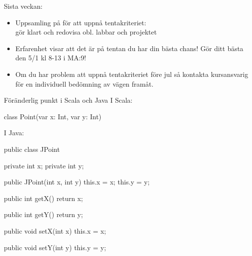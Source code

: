 \newcommand{\legend}[2][]{
    \begin{scope}[#1]
    \path
        \foreach \n/\s in {#2}
            {
                  ++(0,-10pt) node[\s,legend box] {} +(5pt,0) node[legend label] {\n}
            }
    ;
    \end{scope}
}


\ifkompendium\else

\begin{Slide}{Sista veckan:}

  \begin{itemize}
    \item Uppsamling på  för att uppnå tentakriteriet: \\ gör klart och redovisa  obl. labbar och projektet

    \item Erfarenhet visar att det är på   tentan du har din bästa chans! Gör ditt bästa den 5/1 kl 8-13 i MA:9!

    \item Om du har problem att uppnå tentakriteriet före jul så kontakta kursansvarig för en individuell bedömning av vägen framåt.
  \end{itemize}

\end{Slide}




\begin{Slide}{Föränderlig punkt  i Scala och Java}\SlideFontSmall
I Scala:
\begin{Code}
class Point(var x: Int, var y: Int)
\end{Code}
\pause
I Java:
\begin{Code}[language=Java,basicstyle=\ttfamily\SlideFontSize{5.2}{6}]
public class JPoint {
    private int x;
    private int y;

    public JPoint(int x, int y){
        this.x = x;
        this.y = y;
    }

    public int getX(){
        return x;
    }

    public int getY(){
        return y;
    }

    public void setX(int x){
        this.x = x;
    }

    public void setY(int y){
        this.y = y;
    }
}
\end{Code}
\end{Slide}

